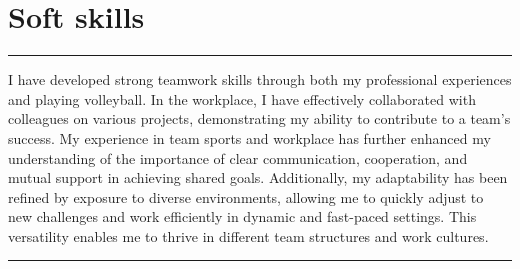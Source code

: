 \documentclass[a4paper,10pt]{article}
\begin{document}
\begin{minipage}[t]{0.25\textwidth}
    \section*{Soft skills}
    \vspace{3.6cm} %
    \rule{0.6cm}{0.3mm}
\end{minipage}
\hfill
\begin{minipage}[t]{0.75\textwidth}
    
I have developed strong teamwork skills through both my professional experiences and playing volleyball. In the workplace, I have effectively collaborated with colleagues on various projects, demonstrating my ability to contribute to a team's success. My experience in team sports and workplace has further enhanced my understanding of the importance of clear communication, cooperation, and mutual support in achieving shared goals. Additionally, my adaptability has been refined by exposure to diverse environments, allowing me to quickly adjust to new challenges and work efficiently in dynamic and fast-paced settings. This versatility enables me to thrive in different team structures and work cultures.

    \rule{\linewidth}{0.5mm}
\end{minipage}
\end{document}
